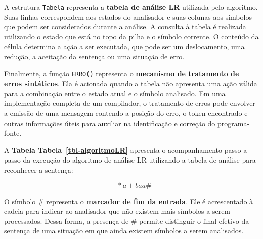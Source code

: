 \documentclass[
  brazilian,
  letterpaper,
]{book}
\theoremstyle{plain}
\theoremstyle{definition}
\theoremstyle{remark}
\begin{document}
A estrutura \texttt{Tabela} representa a \textbf{tabela de análise LR}
utilizada pelo algoritmo. Suas linhas correspondem aos estados do
analisador e suas colunas aos símbolos que podem ser considerados
durante a análise. A consulta à tabela é realizada utilizando o estado
que está no topo da pilha e o símbolo corrente. O conteúdo da célula
determina a ação a ser executada, que pode ser um deslocamento, uma
redução, a aceitação da sentença ou uma situação de erro.

Finalmente, a função \texttt{ERRO()} representa o \textbf{mecanismo de
tratamento de erros sintáticos}. Ela é acionada quando a tabela não
apresenta uma ação válida para a combinação entre o estado atual e o
símbolo analisado. Em uma implementação completa de um compilador, o
tratamento de erros pode envolver a emissão de uma mensagem contendo a
posição do erro, o token encontrado e outras informações úteis para
auxiliar na identificação e correção do programa-fonte.

A \textbf{Tabela Tabela~\ref{tbl-algoritmoLR}} apresenta o
acompanhamento passo a passo da execução do algoritmo de análise LR
utilizando a tabela de análise para reconhecer a sentença:

\[
+\!*a+baa\#
\]

O símbolo \(\#\) representa o \textbf{marcador de fim da entrada}. Ele é
acrescentado à cadeia para indicar ao analisador que não existem mais
símbolos a serem processados. Dessa forma, a presença de \(\#\) permite
distinguir o final efetivo da sentença de uma situação em que ainda
existem símbolos a serem analisados.
\end{document}
